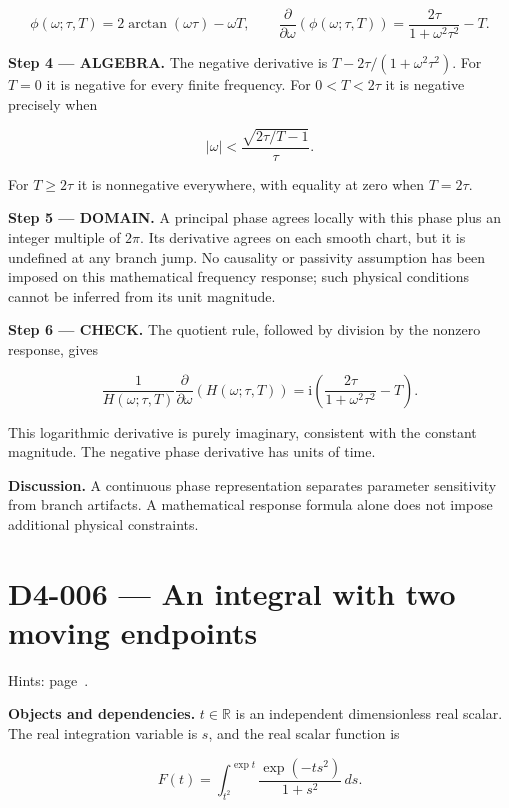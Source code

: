 \documentclass[11pt,oneside,openany]{book}
\begin{document}
\[
\phi(\omega;\tau,T)=2\arctan(\omega\tau)-\omega T,\qquad
\frac{\partial}{\partial\omega}\left(\phi(\omega;\tau,T)\right)
=\frac{2\tau}{1+\omega^2\tau^2}-T.
\]

\begingroup\color{AlgebraBlue}
\textbf{Step 4 --- ALGEBRA.} The negative derivative is \(T-2\tau/(1+\omega^2\tau^2)\). For \(T=0\) it is negative for every finite frequency. For \(0<T<2\tau\) it is negative precisely when

\[
|\omega|<\frac{\sqrt{2\tau/T-1}}{\tau}.
\]

For \(T\ge2\tau\) it is nonnegative everywhere, with equality at zero when \(T=2\tau\).

\endgroup
\begin{DomainStep}
\textbf{Step 5 --- DOMAIN.} A principal phase agrees locally with this phase plus an integer multiple of \(2\pi\). Its derivative agrees on each smooth chart, but it is undefined at any branch jump. No causality or passivity assumption has been imposed on this mathematical frequency response; such physical conditions cannot be inferred from its unit magnitude.

\end{DomainStep}
\textbf{Step 6 --- CHECK.} The quotient rule, followed by division by the nonzero response, gives

\[
\frac{1}{H(\omega;\tau,T)}
\frac{\partial}{\partial\omega}\left(H(\omega;\tau,T)\right)
=\mathrm{i}\left(\frac{2\tau}{1+\omega^2\tau^2}-T\right).
\]

This logarithmic derivative is purely imaginary, consistent with the constant magnitude. The negative phase derivative has units of time.

\textbf{Discussion.} A continuous phase representation separates parameter sensitivity from branch artifacts. A mathematical response formula alone does not impose additional physical constraints.
\clearpage
\section{D4-006 --- An integral with two moving endpoints}
\label{problem:D4-006}
{\small Hints: page~\pageref{hints:D4-006}.}\par\medskip

\textbf{Objects and dependencies.} \(t\in\mathbb R\) is an independent dimensionless real scalar. The real integration variable is \(s\), and the real scalar function is

\[
F(t)=\int_{t^2}^{\exp t}\frac{\exp(-ts^2)}{1+s^2}\,ds.
\]
\end{document}
